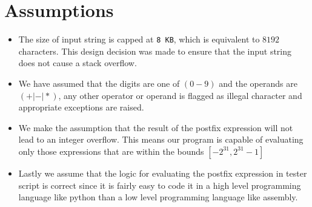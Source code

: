 \documentclass[hidelinks,12pt]{article}
\begin{document}
\section{Assumptions}
\begin{itemize}
    \item The size of input string is capped at \verb|8 KB|, which is equivalent to $8192$ characters. This design decision was made to ensure that the input string does not cause a stack overflow.
    \item We have assumed that the digits are one of $(0-9)$ and the operands are $(+|-|*)$, any other operator or operand is flagged as illegal character and appropriate exceptions are raised.
    \item We make the assumption that the result of the postfix expression will not lead to an integer overflow. This means our program is capable of evaluating only those expressions that are within the bounds $[-2^{31}, 2^{31}-1]$
    \item Lastly we assume that the logic for evaluating the postfix expression in tester script is correct since it is fairly easy to code it in a high level programming language like python than a low level programming language like assembly.
\end{itemize}
\end{document}
